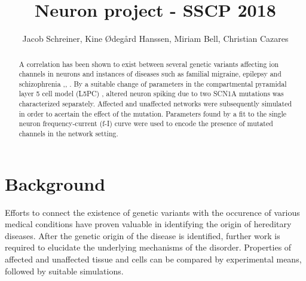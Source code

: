 \documentclass[twocolumn, a4paper,10pt, norsk]{scrartcl}
\title{Neuron project - SSCP 2018} %
\author{Jacob Schreiner, Kine Ødegård Hanssen, Miriam Bell, Christian Cazares}
\date{}
\begin{document}
\maketitle

\begin{abstract} %
 A correlation has been shown to exist between several genetic variants affecting ion channels in neurons and instances of diseases such as familial migraine, epilepsy and schizophrenia \cite{fhm},\cite{epilepsy}, \cite{gautes}. By a suitable change of parameters in the compartmental pyramidal layer 5 cell model (L5PC) \cite{l5pc_model}, altered neuron spiking due to two SCN1A mutations was characterized separately. Affected and unaffected networks were subsequently simulated in order to acertain the effect of the mutation. Parameters found by a fit to the single neuron frequency-current (f-I) curve were used to encode the presence of mutated channels in the network setting. %
\end{abstract}

\section*{Background}


Efforts to connect the existence of genetic variants with the occurence of various medical conditions have proven valuable in identifying the origin of hereditary diseases. After the genetic origin of the disease is identified, further work is required to elucidate the underlying mechanisms of the disorder. Properties of affected and unaffected tissue and cells can be compared by experimental means, followed by suitable simulations.

\end{document}
